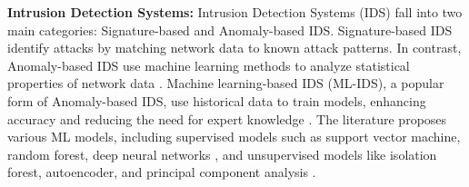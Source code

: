 \textbf{Intrusion Detection Systems:} %
Intrusion Detection Systems (IDS) fall into two main categories: Signature-based and Anomaly-based IDS. Signature-based IDS identify attacks by matching network data to known attack patterns. In contrast, Anomaly-based IDS use machine learning methods to analyze statistical properties of network data \cite{gupta2023surveyIDS}. Machine learning-based IDS (ML-IDS), a popular form of Anomaly-based IDS, use historical data to train models, enhancing accuracy and reducing the need for expert knowledge \cite{gungor2024rigorous}. The literature proposes various ML models, including supervised models such as support vector machine, random forest, deep neural networks \cite{liu2019machine}, and unsupervised models like isolation forest, autoencoder, and principal component analysis \cite{verkerken2022towards}.

